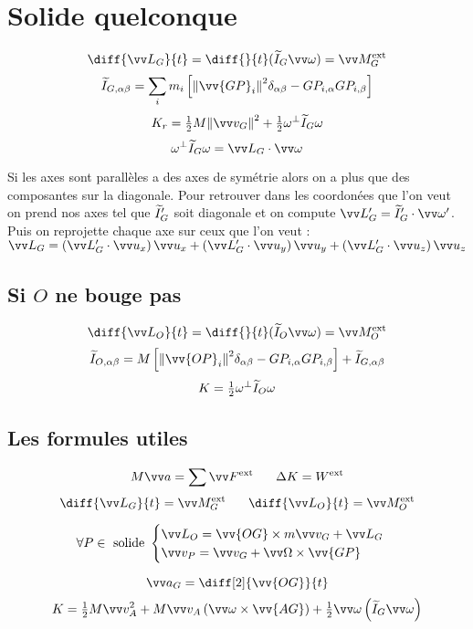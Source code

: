\documentclass[../main.tex]{subfiles}
\begin{document}
\section{Solide quelconque}
\[
  \diff{\mc_G}{t}=\diff{}{t}(\widetilde{I}_G\vian)=\mf_G^{\exte}
\]
\[
  \ti_{G,\alpha\beta}=\sum_im_i\left[\norm{\vv{GP}_i}^2\delta_{\alpha\beta} - GP_{i,\alpha}GP_{i,\beta}\right]
\]
\[
  K_r = \tfrac{1}{2}M\norm{\vi_G}^2 + \tfrac{1}{2}\omega^{\bot}\ti_G\omega
\]
\[
  \omega^{\bot}\ti_G\omega=\mc_G\cdot\vian
\]

Si les axes sont parallèles a des axes de symétrie alors on a plus que des composantes sur la diagonale. Pour retrouver dans les coordonées que l'on veut on prend nos axes tel que \(\widetilde{I}_G'\) soit diagonale et on compute \(\mc_G'=\ti_G'\cdot\vian'\). Puis on reprojette chaque axe sur ceux que l'on veut : \(\mc_G=\left(\mc_G'\cdot\ux\right)\ux + \left(\mc_G'\cdot\uy\right)\uy + \left(\mc_G'\cdot\uz\right)\uz\)

\subsection{Si \(O\) ne bouge pas}
\[
  \diff{\mc_O}{t}=\diff{}{t}(\widetilde{I}_O\vian)=\mf_O^{\exte}
\]
\[
  \ti_{O,\alpha\beta}=M\left[\norm{\vv{OP}_i}^2\delta_{\alpha\beta} - GP_{i,\alpha}GP_{i,\beta}\right] + \ti_{G,\alpha\beta}
\]
\[
  K =\tfrac{1}{2}\omega^{\bot}\widetilde{I}_O\omega
\]
\subsection{Les formules utiles}
\[
  M\ac = \sum\F^{\exte} \phantom{text} \Delta K = W^{\exte}
\]
\[
  \diff{\mc_G}{t}=\mf_G^{\exte} \phantom{text} \diff{\mc_O}{t}=\mf_O^{\exte}
\]

\[ \forall P\in \text{ solide } 
  \begin{cases}
    \mc_O = \vv{OG}\times m\vi_G + \mc_G \\
    \vi_P = \vi_G + \Vian\times\vv{GP}
  \end{cases}
\]

\[
  \ac_G = \diff[2]{\vv{OG}}{t}
\]
\[
  K = \tfrac{1}{2}M\vi_A^2 + M\vi_A\left(\vian\times\vv{AG}\right) + \tfrac{1}{2}\vian\left(\ti_G\vian\right)
\]
\end{document}
